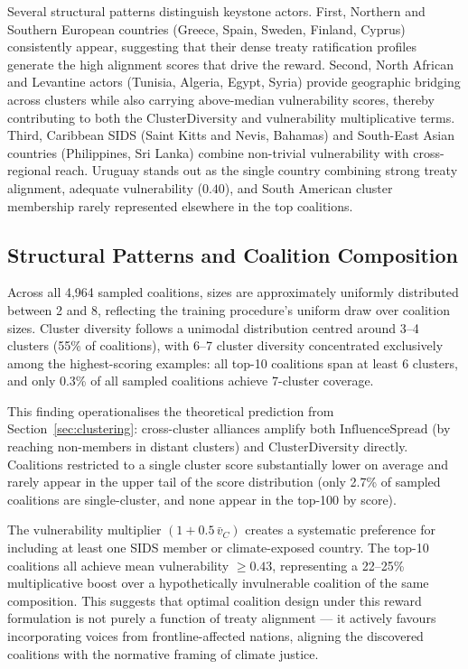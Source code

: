 \documentclass[11pt]{article}
\begin{document}
Several structural patterns distinguish keystone actors. First, Northern and Southern European countries (Greece, Spain, Sweden, Finland, Cyprus) consistently appear, suggesting that their dense treaty ratification profiles generate the high alignment scores that drive the reward. Second, North African and Levantine actors (Tunisia, Algeria, Egypt, Syria) provide geographic bridging across clusters while also carrying above-median vulnerability scores, thereby contributing to both the $\mathrm{ClusterDiversity}$ and vulnerability multiplicative terms. Third, Caribbean SIDS (Saint Kitts and Nevis, Bahamas) and South-East Asian countries (Philippines, Sri Lanka) combine non-trivial vulnerability with cross-regional reach. Uruguay stands out as the single country combining strong treaty alignment, adequate vulnerability ($0.40$), and South American cluster membership rarely represented elsewhere in the top coalitions.

\subsection{Structural Patterns and Coalition Composition}
\label{sec:results_structure}

Across all 4{,}964 sampled coalitions, sizes are approximately uniformly distributed between 2 and 8, reflecting the training procedure's uniform draw over coalition sizes. Cluster diversity follows a unimodal distribution centred around 3--4 clusters (55\% of coalitions), with 6--7 cluster diversity concentrated exclusively among the highest-scoring examples: all top-10 coalitions span at least 6 clusters, and only 0.3\% of all sampled coalitions achieve 7-cluster coverage.

This finding operationalises the theoretical prediction from Section~\ref{sec:clustering}: cross-cluster alliances amplify both $\mathrm{InfluenceSpread}$ (by reaching non-members in distant clusters) and $\mathrm{ClusterDiversity}$ directly. Coalitions restricted to a single cluster score substantially lower on average and rarely appear in the upper tail of the score distribution (only 2.7\% of sampled coalitions are single-cluster, and none appear in the top-100 by score).

The vulnerability multiplier $(1 + 0.5\,\bar{v}_C)$ creates a systematic preference for including at least one SIDS member or climate-exposed country. The top-10 coalitions all achieve mean vulnerability $\geq 0.43$, representing a 22--25\% multiplicative boost over a hypothetically invulnerable coalition of the same composition. This suggests that optimal coalition design under this reward formulation is not purely a function of treaty alignment — it actively favours incorporating voices from frontline-affected nations, aligning the discovered coalitions with the normative framing of climate justice.
\end{document}
